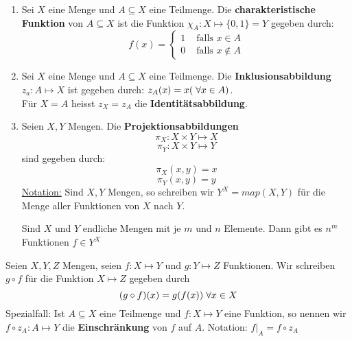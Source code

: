 \documentclass[main.tex]{subfiles}
\begin{document}
\begin{Beispiel}
  \begin{enumerate}
    \item Sei $X$ eine Menge und $A \subseteq X$ eine Teilmenge. Die \textbf{charakteristische Funktion} von $A \subseteq X$ ist die Funktion $\chi_A : X \mapsto \{0,1\} = Y$ gegeben durch:
    $$f(x) =
    \left\{
    \begin{aligned}
      1 &\text{ falls } x \in A\\
      0 &\text{ falls } x \notin A
    \end{aligned}\right.$$

    \item Sei $X$ eine Menge und $A \subseteq X$ eine Teilmenge. Die \textbf{Inklusionsabbildung} $z_a : A \mapsto X$ ist gegeben durch: $z_A (x) = x (\;\forall x\in A)$.\\
    Für $X=A$ heisst $z_X = z_A$ die \textbf{Identitätsabbildung}.
    \item Seien $X,Y$ Mengen. Die \textbf{Projektionsabbildungen}
    $$π_X : X \times Y \mapsto X$$
    $$π_Y : X \times Y \mapsto Y$$
    sind gegeben durch:
    $$π_X (x,y) =x$$
    $$π_Y (x,y) =y$$
    \underline{Notation:} Sind $X,Y$ Mengen, so schreiben wir $Y^X = map(X,Y)$ für die Menge aller Funktionen von $X$ nach $Y$.
    \begin{Bemerkung}
      Sind $X$ und $Y$ endliche Mengen mit je $m$ und $n$ Elemente. Dann gibt es $n^m$ Funktionen $f\in Y^X$
    \end{Bemerkung}
  \end{enumerate}
\end{Beispiel}


\begin{Definition}[Verknüpfung]
  Seien $X,Y,Z$ Mengen, seien $f:X\mapsto Y$ und $g: Y \mapsto Z$ Funktionen. Wir schreiben $g \circ f$ für die Funktion $X \mapsto Z$ gegeben durch
  $$(g\circ f)(x) = g(f(x)) \;\forall x \in X$$
  Spezialfall: Ist $A \subseteq X$ eine Teilmenge und $f:X\mapsto Y$ eine Funktion, so nennen wir $f \circ z_A : A \mapsto Y$ die \textbf{Einschränkung} von $f$ auf $A$. Notation: $f|_A = f \circ z_A$
\end{Definition}
\end{document}
